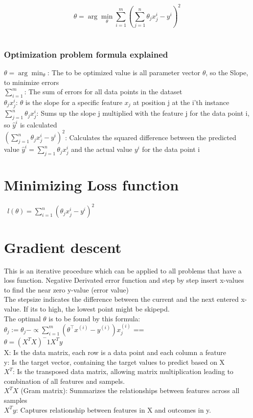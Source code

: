 \documentclass{article}
\begin{document}
\[
\theta = \arg\min_{\theta} \sum_{i=1}^{m} \left( \sum_{j=1}^{n} \theta_j x_j^i - y^i \right)^2
\] \\ 
\subsubsection{Optimization problem formula explained}
$\theta = \arg\min_{\theta}$: The to be optimized value is all parameter vector $\theta$, so the Slope, to minimize errors\\
$\sum_{i=1}^{m}$: The sum of errors for all data points in the dataset \\ 
$\theta_j x_j^i$: $\theta$ is the slope for a specific feature $x_j$ at position j at the i'th instance \\ 
$\sum_{j=1}^{n}\theta_j x_j^i$: Sums up the slope j multiplied with the feature j for the data point i, so $\hat{y}^i$ is calculated\\ 
$( \sum_{j=1}^{n} \theta_j x_j^i - y^i)^2$: Calculates the squared difference between the predicted value $\hat{y}^i = \sum_{j=1}^{n}\theta_j x_j^i$ and the actual value $y^i$ for the data point i

\section{Minimizing Loss function}\
$l(\theta ) = \sum_{i=1}^{n} (\theta_j x_j^i - y^i)^2$

\section{Gradient descent}
This is an iterative procedure which can be applied to all problems that have a loss function.
Negative Derivated error function and step by step insert x-values to find the near zero y-value (error value) \\
The stepsize indicates the difference between the current and the next entered x-value. If its to high, the lowest point might be skipepd. \\
The optimal $\theta$ is to be found by this formula: \\
$\theta_j := \theta_j - \propto \sum_{i=1}^{m} \left( \theta^\top x^{(i)} - y^{(i)} \right) x_j^{(i)}$ ==\\
$\theta = (X^TX)^-1X^Ty$ \\ 
X: Is the data matrix, each row is a data point and each column a feature \\
y: Is the target vector, containing the target values to predict based on X \\
$X^T$: Is the transposed data matrix, allowing matrix multiplication leading to combination of all features and sampels.\\
$X^TX$ (Gram matrix): Summarizes the relationships between features across all samples \\
$X^Ty$: Captures relationship between features in X and outcomes in y.
\end{document}
